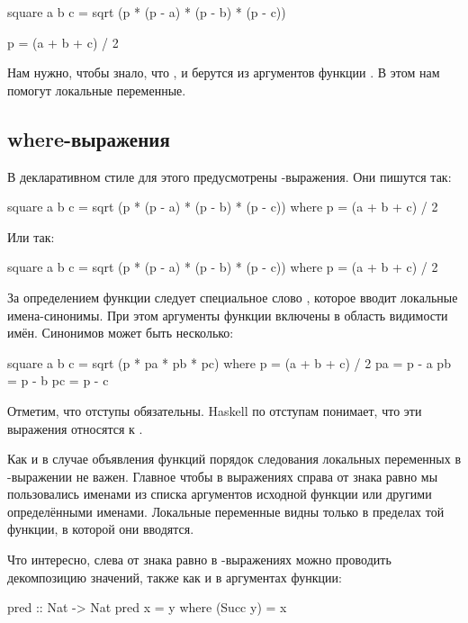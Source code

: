 \begin{code}
square a b c = sqrt (p * (p - a) * (p - b) * (p - c))

p = (a + b + c) / 2
\end{code}

Нам нужно, чтобы  знало, что ,  и  
берутся из аргументов функции . 
В этом нам помогут локальные переменные.

\subsection{where-выражения}

В декларативном стиле для этого предусмотрены  
-выражения. Они пишутся так:

\begin{code}
square a b c = sqrt (p * (p - a) * (p - b) * (p - c))
    where p = (a + b + c) / 2
\end{code}

Или так:

\begin{code}
square a b c = sqrt (p * (p - a) * (p - b) * (p - c)) where 
    p = (a + b + c) / 2
\end{code}

За определением функции следует специальное слово ,
которое вводит локальные имена-синонимы. При этом аргументы
функции включены в область видимости имён. Синонимов может быть
несколько:

\begin{code}
square a b c = sqrt (p * pa * pb * pc)
    where p  = (a + b + c) / 2
          pa = p - a
          pb = p - b
          pc = p - c
\end{code}

Отметим, что отступы обязательны. Haskell по отступам
понимает, что эти выражения относятся к . 

Как и в случае объявления функций порядок следования 
локальных переменных в -выражении не важен. 
Главное чтобы в выражениях справа от знака равно мы
пользовались именами из списка аргументов исходной функции
или другими определёнными именами.
Локальные переменные видны только в пределах той
функции, в которой они вводятся.

Что интересно, слева от знака равно в -выражениях 
можно проводить декомпозицию значений, также как и в аргументах
функции:

\begin{code}
pred :: Nat -> Nat
pred x = y
    where (Succ y) = x
\end{code}


